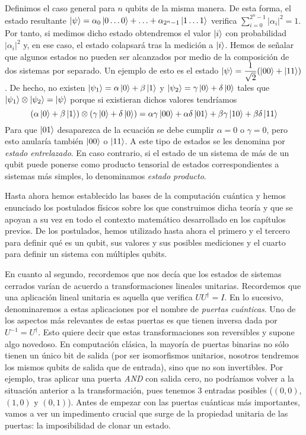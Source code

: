 Definimos el caso general para $n$ qubits de la misma manera. De esta forma, el estado resultante $\left|\psi\right\rangle=\alpha_0\left|0\hdots0\right\rangle+\hdots+\alpha_{2^n-1}\left|1\hdots1\right\rangle$ verifica $\sum_{i=0}^{2^n-1}|\alpha_i|^2=1$. Por tanto, si medimos dicho estado obtendremos el valor $\left|i\right\rangle$ con probabilidad $|\alpha_i|^2$ y, en ese caso, el estado colapsará tras la medición a $\left|i\right\rangle$. Hemos de señalar que algunos estados no pueden ser alcanzados por medio de la composición de dos sistemas por separado. Un ejemplo de esto es el estado $\left|\psi\right\rangle=\dfrac{1}{\sqrt{2}}(\left|00\right\rangle+\left|11\right\rangle)$. De hecho, no existen $\left|\psi_1\right\rangle=\alpha\left|0\right\rangle+\beta\left|1\right\rangle$ y $\left|\psi_2\right\rangle=\gamma\left|0\right\rangle+\delta\left|0\right\rangle$ tales que $\left|\psi_1\right\rangle\otimes\left|\psi_2\right\rangle=\left|\psi\right\rangle$ porque si existieran dichos valores  tendríamos
\[(\alpha\left|0\right\rangle+\beta\left|1\right\rangle)\otimes(\gamma\left|0\right\rangle+\delta\left|0\right\rangle)=\alpha\gamma\left|00\right\rangle+\alpha\delta\left|01\right\rangle+\beta\gamma\left|10\right\rangle+\beta\delta\left|11\right\rangle\]
%
Para que $\left|01\right\rangle$ desaparezca de la ecuación se debe cumplir $\alpha =0$ o  $\gamma=0$, pero esto anularía también $\left|00\right\rangle$ o $\left|11\right\rangle$. A este tipo de estados se les denomina por \textit{estado entrelazado}. En caso contrario, si el estado de un sistema de más de un qubit puede ponerse como producto tensorial de estados correspondientes a sistemas más simples, lo denominamos \textit{estado producto}.

Hasta ahora hemos establecido las bases de la computación cuántica y hemos enunciado los postulados físicos sobre los que construimos dicha teoría y que se apoyan a su vez en todo el contexto matemático desarrollado en los capítulos previos. De los postulados, hemos utilizado hasta ahora el primero y el tercero para definir qué es un qubit, sus valores y sus posibles mediciones y el cuarto para definir un sistema con múltiples qubits.

En cuanto al segundo, recordemos que nos decía que los estados de sistemas cerrados varían de acuerdo a transformaciones lineales unitarias. Recordemos que una aplicación lineal unitaria es aquella que verifica $UU^\dag=I$. En lo sucesivo, denominaremos a estas aplicaciones por el nombre de \textit{puertas cuánticas}. Uno de los aspectos más relevantes de estas puertas es que tienen inversa dada por $U^{-1}=U^\dag$. Esto quiere decir que estas transformaciones son reversibles y supone algo novedoso. En computación clásica, la mayoría de puertas binarias no sólo tienen un único bit de salida (por ser isomorfismos unitarios, nosotros tendremos los mismos qubits de salida que de entrada), sino que no son invertibles. Por ejemplo, tras aplicar una puerta \textit{AND} con salida cero, no podríamos volver a la situación  anterior a la transformación, pues tenemos 3 entradas posibles ($(0,0)$, $(1,0)$ y $(0,1)$). Antes de empezar con las puertas cuánticas más importantes, vamos a ver un impedimento crucial que surge de la propiedad unitaria de las puertas: la imposibilidad de clonar un estado.

